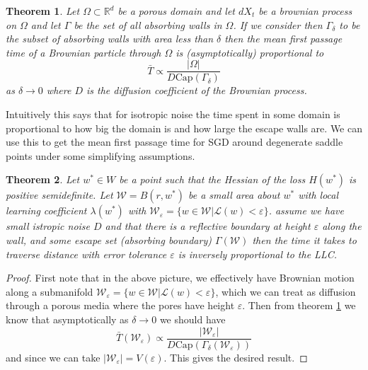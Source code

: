 \documentclass{article} %
\newtheorem{theorem}{Theorem}[section]
\theoremstyle{definition}
\begin{document}
\begin{theorem}\label{thm:escape_time}
    Let $\Omega\subset \mathbb{R}^d$ be a porous domain and let $dX_t$ be a brownian process on $\Omega$ and let $\Gamma$ be the set of all absorbing walls in $\Omega$. If we consider then $\Gamma_\delta$ to be the subset of absorbing walls with area less than $\delta$ then the mean first passage time of a Brownian particle through $\Omega$ is (asymptotically) proportional to
    \begin{equation}
        \bar{T} \propto \frac{|\Omega|}{D \text{Cap}(\Gamma_\delta)}
    \end{equation}
as $\delta \to 0$ where $D$ is the diffusion coefficient of the Brownian process.
\end{theorem}
Intuitively this says that for isotropic noise the time spent in some domain is proportional to how big the domain is and how large the escape walls are. We can use this to get the mean first passage time for SGD around degenerate saddle points under some simplifying assumptions.

\begin{theorem}
    Let $w^* \in W$ be a point such that the Hessian of the loss $H(w^*)$ is positive semidefinite. Let $\mathcal{W} = B(r, w^*)$ be a small area about $w^*$ with local learning coefficient $\lambda(w^*)$ with $\mathcal{W_{\varepsilon}} = \{ w \in \mathcal{W} | \mathcal{L}(w) < \varepsilon \}$. assume we have small istropic noise $D$ and that there is a reflective boundary at height $\varepsilon$ along the wall, and some escape set (absorbing boundary) $\Gamma(\mathcal{W})$ then the time it takes to traverse distance  with error tolerance $\varepsilon$ is inversely proportional to the LLC.
\end{theorem}
\begin{proof}
    First note that in the above picture, we effectively have Brownian motion along a submanifold $\mathcal{W_{\varepsilon}} = \{ w \in \mathcal{W} | \mathcal{L}(w) < \varepsilon \}$, which we can treat as diffusion through a porous media where the pores have height $\varepsilon$. Then from theorem \ref{thm:escape_time} we know that asymptotically as $\delta \to 0$ we should have
    \begin{equation}
        \bar{T}(\mathcal{W}_\varepsilon) \propto \frac{|\mathcal{W}_\varepsilon|}{D \text{Cap}(\Gamma_\delta(\mathcal{W}_\varepsilon))}
    \end{equation}
    and since we can take $|\mathcal{W}_\varepsilon| = V(\varepsilon)$. This gives the desired result.
\end{proof}
\end{document}
